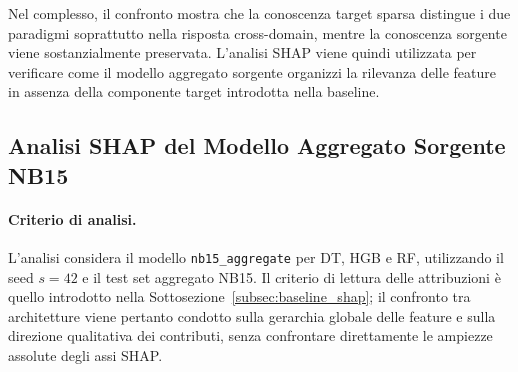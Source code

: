 Nel complesso, il confronto mostra che la conoscenza target sparsa distingue i due paradigmi soprattutto nella risposta cross-domain, mentre la conoscenza sorgente viene sostanzialmente preservata. 
L'analisi SHAP viene quindi utilizzata per verificare come il modello aggregato sorgente organizzi la rilevanza delle feature in assenza della componente target introdotta nella baseline.



\subsection{Analisi SHAP del Modello Aggregato Sorgente NB15}
\label{subsec:sorgente_shap}

\paragraph{Criterio di analisi.}
L'analisi considera il modello \texttt{nb15\_aggregate} per DT, HGB e RF, utilizzando il seed $s=42$ e il test set aggregato NB15. 
Il criterio di lettura delle attribuzioni è quello introdotto nella Sottosezione~\ref{subsec:baseline_shap}; il confronto tra architetture viene pertanto condotto sulla gerarchia globale delle feature e sulla direzione qualitativa dei contributi, senza confrontare direttamente le ampiezze assolute degli assi SHAP.

